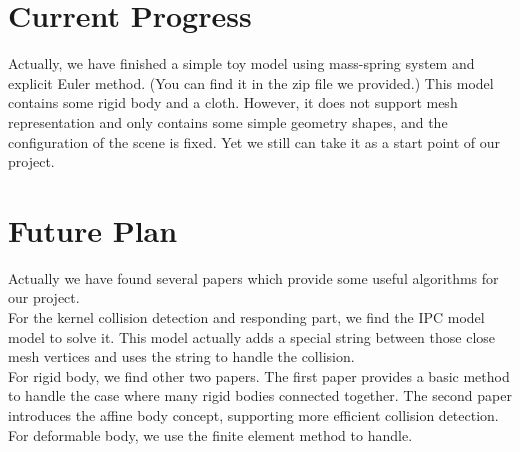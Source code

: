 \documentclass[SIGGRAPH]{acmart}
\begin{document}
\section{Current Progress}
Actually, we have finished a simple toy model using mass-spring system and explicit Euler method. (You can find it in the zip file we provided.) This model contains some rigid body and a cloth. However, it does not support mesh representation and only contains some simple geometry shapes, and the configuration of the scene is fixed. Yet we still can take it as a start point of our project.

\section{Future Plan}
Actually we have found several papers which provide some useful algorithms for our project.\\
For the kernel collision detection and responding part, we find the  IPC model\cite{li2020incremental} model to solve it. This model actually adds a special string between those close mesh vertices and uses the string to handle the collision.\\
For rigid body, we find other two papers. The first paper\cite{liu2012quick} provides a basic method to handle the case where many rigid bodies connected together. The second paper\cite{lan2022affine} introduces the affine body concept, supporting more efficient collision detection.\\
For deformable body, we use the finite element method\cite{barbicsiggraph} to handle.




\end{document}
